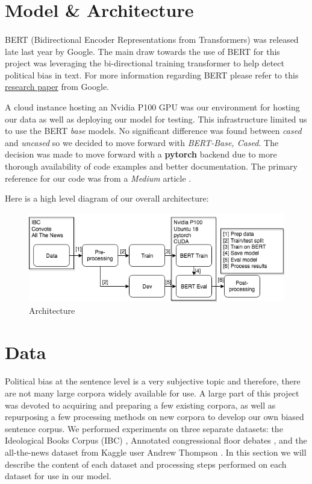 \documentclass[10pt,a4paper,onecolumn]{article}
\begin{document}
\section{Model \& Architecture}
\paragraph{}
BERT (Bidirectional Encoder Representations from Transformers) was released late last year by Google. The main draw towards the use of BERT for this project was leveraging the bi-directional training transformer to help detect political bias in text. For more information regarding BERT please refer to this \href{https://arxiv.org/abs/1810.04805}{research paper} from Google.

A cloud instance hosting an Nvidia P100 GPU was our environment for hosting our data as well as deploying our model for testing. This infrastructure limited us to use the BERT \textit{base} models. No significant difference was found between \textit{cased} and \textit{uncased} so we decided to move forward with \textit{BERT-Base, Cased}. The decision was made to move forward with a \textbf{pytorch} backend due to more thorough availability of code examples and better documentation. The primary reference for our code was from a \textit{Medium} article \cite{usingbert}.

Here is a high level diagram of our overall architecture:
\begin{figure}
	\begin{center}
		\includegraphics[width=0.8\linewidth]{architecture.png}
		\caption{Architecture}
		\label{fig:architecture}
	\end{center}
\end{figure}

\newpage

\section{Data}
\label{sec:data}
\paragraph{}
Political bias at the sentence level is a very subjective topic and therefore, there are not many large corpora widely available for use. A large part of this project was devoted to acquiring and preparing a few existing corpora, as well as repurposing a few processing methods on new corpora to develop our own biased sentence corpus. We performed experiments on three separate datasets: the Ideological Books Corpus (IBC) \cite{iyyerRNN}, Annotated congressional floor debates \cite{convote}, and the all-the-news dataset from Kaggle user Andrew Thompson \cite{news}. In this section we will describe the content of each dataset and processing steps performed on each dataset for use in our model.
\end{document}
